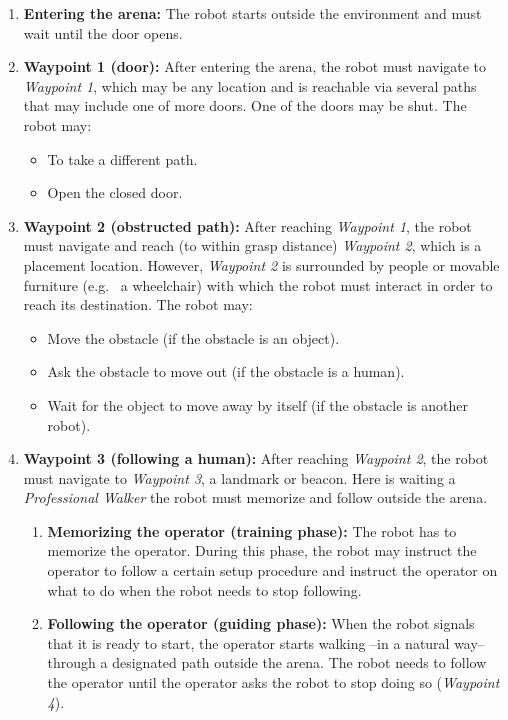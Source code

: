 \begin{enumerate}
	\item \textbf{Entering the arena:} The robot starts outside the environment and must wait until the door opens.

	\item \textbf{Waypoint 1 (door):} After entering the arena, the robot must navigate to \textit{Waypoint 1}, 
	  which may be any location and is reachable via several paths that may include one of more doors.
	One of the doors may be shut. The robot may:
	\begin{itemize}
		\item To take a different path.
		\item Open the closed door.
	\end{itemize}

	\item \textbf{Waypoint 2 (obstructed path):} After reaching \textit{Waypoint 1}, the robot must navigate and reach (to within grasp distance) \textit{Waypoint 2}, which is a placement location. 
	However, \textit{Waypoint 2} is surrounded by people or movable furniture (e.g.~ a wheelchair) with which the robot must interact in order to reach its destination. The robot may:
	\begin{itemize}
		\item Move the obstacle (if the obstacle is an object).
		\item Ask the obstacle to move out (if the obstacle is a human).
		\item Wait for the object to move away by itself (if the obstacle is another robot).
	\end{itemize}

	\item \textbf{Waypoint 3 (following a human):} After reaching \textit{Waypoint 2}, the robot must navigate to \textit{Waypoint 3}, a landmark or beacon. 
	Here is waiting a \textit{Professional Walker} the robot must memorize and follow outside the arena.

	\begin{enumerate}
	\item \textbf{Memorizing the operator (training phase):} The robot has to memorize the operator.
	During this phase, the robot may instruct the operator to follow a certain setup procedure and instruct the operator on what to do when the robot needs to stop following.
	
	\item \textbf{Following the operator (guiding phase):} 
	When the robot signals that it is ready to start, the operator starts walking --in a natural way-- through a designated path outside the arena. 
	The robot needs to follow the operator until the operator asks the robot to stop doing so (\textit{Waypoint 4}).
	\end{enumerate}


\end{enumerate}
